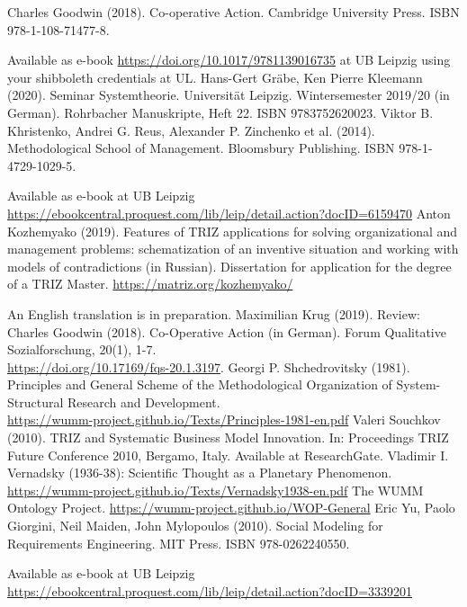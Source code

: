 \documentclass[11pt,a4paper]{article}
\begin{document}
\begin{thebibliography}{xxx}
 Charles Goodwin (2018). Co-operative Action.  Cambridge
  University Press. ISBN 978-1-108-71477-8.
  
  Available as e-book \url{https://doi.org/10.1017/9781139016735} at UB
  Leipzig using your shibboleth credentials at UL.
 Hans-Gert Gräbe, Ken Pierre Kleemann (2020). Seminar
  Systemtheorie. Universität Leipzig. Wintersemester 2019/20 (in German).
  Rohrbacher Manuskripte, Heft 22. ISBN 9783752620023.
 Viktor B. Khristenko, Andrei G. Reus, Alexander
  P. Zinchenko et al. (2014). Methodological School of Management. Bloomsbury
  Publishing.  ISBN 978-1-4729-1029-5.

  Available as e-book at UB Leipzig\\
  \url{https://ebookcentral.proquest.com/lib/leip/detail.action?docID=6159470}
 Anton Kozhemyako (2019). Features of TRIZ
  applications for solving organizational and management problems:
  schematization of an inventive situation and working with models of
  contradictions (in Russian).  Dissertation for application for the degree of
  a TRIZ Master. \url{https://matriz.org/kozhemyako/}

  An English translation is in preparation.
 Maximilian Krug (2019). Review: Charles Goodwin (2018).
  Co-Operative Action (in German). Forum Qualitative Sozialforschung, 20(1),
  1-7.  \\ \url{https://doi.org/10.17169/fqs-20.1.3197}.
 Georgi P. Shchedrovitsky (1981). Principles and
  General Scheme of the Methodological Organization of System-Structural
  Research and Development.  \\
  \url{https://wumm-project.github.io/Texts/Principles-1981-en.pdf}
 Valeri Souchkov (2010).  TRIZ and Systematic Business
  Model Innovation.  In: Proceedings TRIZ Future Conference 2010, Bergamo,
  Italy.   Available at ResearchGate.
 Vladimir I. Vernadsky (1936-38): Scientific Thought as
  a Planetary Phenomenon.\\
  \url{https://wumm-project.github.io/Texts/Vernadsky1938-en.pdf}
 The WUMM Ontology Project.
  \url{https://wumm-project.github.io/WOP-General}
 Eric Yu, Paolo Giorgini, Neil Maiden, John Mylopoulos (2010).
  Social Modeling for Requirements Engineering. MIT Press.  ISBN
  978-0262240550.
  
  Available as e-book at UB Leipzig\\
  \url{https://ebookcentral.proquest.com/lib/leip/detail.action?docID=3339201}
\end{thebibliography}
\end{document}
